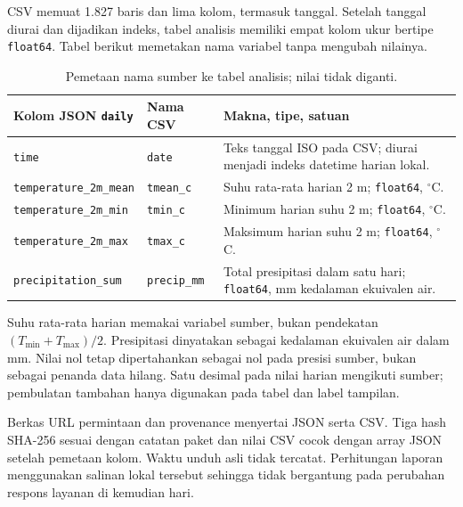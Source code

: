\documentclass[12pt,a4paper]{article}
\begin{document}
CSV memuat 1.827 baris dan lima kolom, termasuk tanggal. Setelah tanggal diurai dan dijadikan indeks, tabel analisis memiliki empat kolom ukur bertipe \texttt{float64}. Tabel berikut memetakan nama variabel tanpa mengubah nilainya.
\begin{table}[htbp]\centering\footnotesize
\caption{Pemetaan nama sumber ke tabel analisis; nilai tidak diganti.}
\begin{tabularx}{\textwidth}{@{}p{4.2cm}p{2.1cm}X@{}}\toprule
Kolom JSON \texttt{daily} & Nama CSV & Makna, tipe, satuan\\\midrule
\texttt{time} & \texttt{date} & Teks tanggal ISO pada CSV; diurai menjadi indeks datetime harian lokal.\\
\texttt{temperature\_2m\_mean} & \texttt{tmean\_c} & Suhu rata-rata harian 2 m; \texttt{float64}, $^\circ$C.\\
\texttt{temperature\_2m\_min} & \texttt{tmin\_c} & Minimum harian suhu 2 m; \texttt{float64}, $^\circ$C.\\
\texttt{temperature\_2m\_max} & \texttt{tmax\_c} & Maksimum harian suhu 2 m; \texttt{float64}, $^\circ$C.\\
\texttt{precipitation\_sum} & \texttt{precip\_mm} & Total presipitasi dalam satu hari; \texttt{float64}, mm kedalaman ekuivalen air.\\\bottomrule
\end{tabularx}
\end{table}
Suhu rata-rata harian memakai variabel sumber, bukan pendekatan $(T_{\min}+T_{\max})/2$. Presipitasi dinyatakan sebagai kedalaman ekuivalen air dalam mm. Nilai nol tetap dipertahankan sebagai nol pada presisi sumber, bukan sebagai penanda data hilang. Satu desimal pada nilai harian mengikuti sumber; pembulatan tambahan hanya digunakan pada tabel dan label tampilan.

Berkas URL permintaan dan provenance menyertai JSON serta CSV. Tiga hash SHA-256 sesuai dengan catatan paket dan nilai CSV cocok dengan array JSON setelah pemetaan kolom. Waktu unduh asli tidak tercatat. Perhitungan laporan menggunakan salinan lokal tersebut sehingga tidak bergantung pada perubahan respons layanan di kemudian hari.
\end{document}
